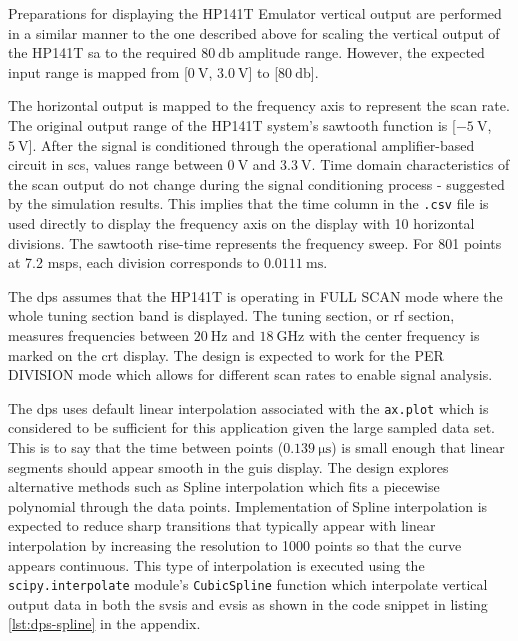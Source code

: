 \documentclass[class=report,11pt,crop=false]{standalone}
\begin{document}
	Preparations for displaying the HP141T Emulator vertical output are performed in a similar manner to the one described above for scaling the vertical output of the HP141T \acrshort{sa} to the required $\SI{80}{\decibel}$ amplitude range.  However, the expected input range is mapped from [$\SI{0}{\volt}$, $\SI{3.0}{\volt}$] to [$\SI{80}{\decibel}$].
	
	The horizontal output is mapped to the frequency axis to represent the scan rate. The original output range of the HP141T system's sawtooth function is [$-\SI{5}{\volt}$, $\SI{5}{\volt}$]. After the signal is conditioned through the operational amplifier-based circuit in \acrshort{scs}, values range between $\SI{0}{\volt}$ and $\SI{3.3}{\volt}$. Time domain characteristics of the scan output do not change during the signal conditioning process - suggested by the simulation results. This implies that the time column in the \texttt{.csv} file is used directly to display the frequency axis on the display with 10 horizontal divisions. The sawtooth rise-time represents the frequency sweep. For 801 points at 7.2 \acrshort{msps}, each division corresponds to $\SI{0.0111}{\milli\second}$. 
	
	The \acrshort{dps} assumes that the HP141T is operating in FULL SCAN mode where the whole tuning section band is displayed. The tuning section, or \acrshort{rf} section, measures frequencies between $\SI{20}{\hertz}$ and $\SI{18}{\giga\hertz}$ with the center frequency is marked on the \acrshort{crt} display. The design is expected to work for the PER DIVISION mode which allows for different scan rates to enable signal analysis. 
	
	The \acrshort{dps} uses default linear interpolation associated with the \texttt{ax.plot} which is considered to be sufficient for this application given the large sampled data set. This is to say that the time between points ($\SI{0.139}{\micro\second}$) is small enough that linear segments should appear smooth in the \acrshort{guis} display. The design explores alternative methods such as Spline interpolation which fits a piecewise polynomial through the data points. Implementation of Spline interpolation is expected to reduce sharp transitions that typically appear with linear interpolation by increasing the resolution to 1000 points so that the curve appears continuous. This type of interpolation is executed using the \texttt{scipy.interpolate} module's \texttt{CubicSpline} function which interpolate vertical output data in both the \acrshort{svsis} and \acrshort{evsis} as shown in the code snippet in listing \ref{lst:dps-spline} in the appendix. 
	
\end{document}
